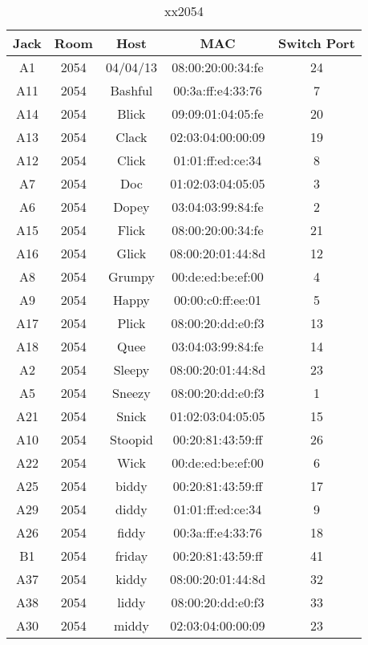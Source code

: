 \documentclass{article}
\begin{document}
\begin{table}[H]
\caption{xx2054} \label{tab:title}
\centering
\begin{tabular}{ | c | c | c | c | c | } \hline
Jack & Room & Host & MAC & Switch Port \\ \hline
A1 & 2054 & 04/04/13 & 08:00:20:00:34:fe & 24
 \\ \hline
A11 & 2054 & Bashful & 00:3a:ff:e4:33:76 & 7
 \\ \hline
A14 & 2054 & Blick & 09:09:01:04:05:fe & 20
 \\ \hline
A13 & 2054 & Clack & 02:03:04:00:00:09 & 19
 \\ \hline
A12 & 2054 & Click & 01:01:ff:ed:ce:34 & 8
 \\ \hline
A7 & 2054 & Doc & 01:02:03:04:05:05 & 3
 \\ \hline
A6 & 2054 & Dopey & 03:04:03:99:84:fe & 2
 \\ \hline
A15 & 2054 & Flick & 08:00:20:00:34:fe & 21
 \\ \hline
A16 & 2054 & Glick & 08:00:20:01:44:8d & 12
 \\ \hline
A8 & 2054 & Grumpy & 00:de:ed:be:ef:00 & 4
 \\ \hline
A9 & 2054 & Happy & 00:00:c0:ff:ee:01 & 5
 \\ \hline
A17 & 2054 & Plick & 08:00:20:dd:e0:f3 & 13
 \\ \hline
A18 & 2054 & Quee & 03:04:03:99:84:fe & 14
 \\ \hline
A2 & 2054 & Sleepy & 08:00:20:01:44:8d & 23
 \\ \hline
A5 & 2054 & Sneezy & 08:00:20:dd:e0:f3 & 1
 \\ \hline
A21 & 2054 & Snick & 01:02:03:04:05:05 & 15
 \\ \hline
A10 & 2054 & Stoopid & 00:20:81:43:59:ff & 26
 \\ \hline
A22 & 2054 & Wick & 00:de:ed:be:ef:00 & 6
 \\ \hline
A25 & 2054 & biddy & 00:20:81:43:59:ff & 17
 \\ \hline
A29 & 2054 & diddy & 01:01:ff:ed:ce:34 & 9
 \\ \hline
A26 & 2054 & fiddy & 00:3a:ff:e4:33:76 & 18
 \\ \hline
B1 & 2054 & friday & 00:20:81:43:59:ff & 41
 \\ \hline
A37 & 2054 & kiddy & 08:00:20:01:44:8d & 32
 \\ \hline
A38 & 2054 & liddy & 08:00:20:dd:e0:f3 & 33
 \\ \hline
A30 & 2054 & middy & 02:03:04:00:00:09 & 23
 \\ \hline

\end{tabular}
\end{table}
\end{document}
